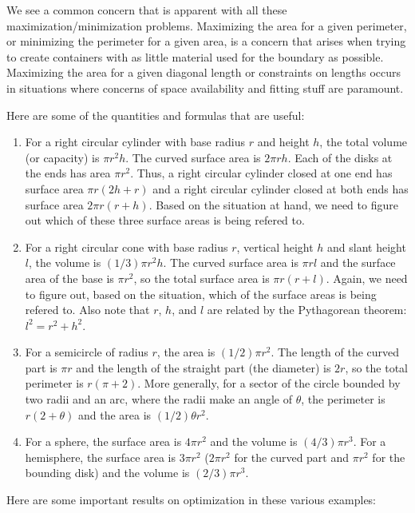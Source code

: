\documentclass[10pt]{amsart}
\begin{document}
We see a common concern that is apparent with all these
maximization/minimization problems. Maximizing the area for a given
perimeter, or minimizing the perimeter for a given area, is a concern
that arises when trying to create containers with as little material
used for the boundary as possible. Maximizing the area for a given
diagonal length or constraints on lengths occurs in situations where
concerns of space availability and fitting stuff are paramount.

Here are some of the quantities and formulas that are useful:

\begin{enumerate}
\item For a right circular cylinder with base radius $r$ and height
  $h$, the total volume (or capacity) is $\pi r^2h$. The curved
  surface area is $2\pi rh$. Each of the disks at the ends has area
  $\pi r^2$. Thus, a right circular cylinder closed at one end has
  surface area $\pi r (2h + r)$ and a right circular cylinder closed
  at both ends has surface area $2\pi r(r + h)$. Based on the
  situation at hand, we need to figure out which of these three
  surface areas is being refered to.
\item For a right circular cone with base radius $r$, vertical height
  $h$ and slant height $l$, the volume is $(1/3) \pi r^2h$. The curved
  surface area is $\pi rl$ and the surface area of the base is $\pi
  r^2$, so the total surface area is $\pi r(r + l)$. Again, we need to
  figure out, based on the situation, which of the surface areas is
  being refered to. Also note that $r$, $h$, and $l$ are related by
  the Pythagorean theorem: $l^2 = r^2 + h^2$.
\item For a semicircle of radius $r$, the area is $(1/2) \pi r^2$. The
  length of the curved part is $\pi r$ and the length of the straight
  part (the diameter) is $2r$, so the total perimeter is $r(\pi +
  2)$. More generally, for a sector of the circle bounded by two radii
  and an arc, where the radii make an angle of $\theta$, the perimeter
  is $r(2 + \theta)$ and the area is $(1/2) \theta r^2$.
\item For a sphere, the surface area is $4 \pi r^2$ and the volume is
  $(4/3) \pi r^3$. For a hemisphere, the surface area is $3\pi r^2$
  ($2\pi r^2$ for the curved part and $\pi r^2$ for the bounding disk)
  and the volume is $(2/3) \pi r^3$.
\end{enumerate}

Here are some important results on optimization in these various examples:
\end{document}
